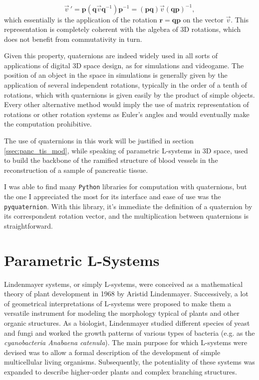 \documentclass[12pt,a4paper]{report}
\begin{document}
    \begin{equation}
        \vec v\,' = \bm{p} ( \bm{q} \vec v \bm{q}^{-1} ) \bm{p}^{-1} = (\bm{p}\bm{q}) \vec v (\bm{q}\bm{p})^{-1},
    \end{equation}
    which essentially is the application of the rotation $\bm{r} = \bm{q}\bm{p}$ on the vector $\vec v$. This representation is completely coherent with the algebra of 3D rotations, which does not benefit from commutativity in turn.

    Given this property, quaternions are indeed widely used in all sorts of applications of digital 3D space design, as for simulations and videogame. The position of an object in the space in simulations is generally given by the application of several independent rotations, typically in the order of a tenth of rotations, which with quaternions is given easily by the product of simple objects. Every other alternative method would imply the use of matrix representation of rotations or other rotation systems as Euler's angles and would eventually make the computation prohibitive.

    The use of quaternions in this work will be justified in section \ref{ssec:panc_tis_mod}, while speaking of parametric L-systems in 3D space, used to build the backbone of the ramified structure of blood vessels in the reconstruction of a sample of pancreatic tissue.

    I was able to find many \texttt{Python} libraries for computation with quaternions, but the one I appreciated the most for its interface and ease of use was the \texttt{pyquaternion}. With this library, it's immediate the definition of a quaternion by its correspondent rotation vector, and the multiplication between quaternions is straightforward.

\section{Parametric L-Systems} \label{ssec:Lsys}
    Lindenmayer systems, or simply L-systems,  were conceived as a mathematical theory of plant development \cite{lindenmayer1968mathematical} in 1968 by Aristid Lindenmayer. Successively, a lot of geometrical interpretations of L-systems were proposed to make them a versatile instrument for modeling the morphology typical of plants and other organic structures. As a biologist, Lindenmayer studied different species of yeast and fungi and worked the growth patterns of various types of bacteria (e.g. as the \textit{cyanobacteria Anabaena catenula}). The main purpose for which L-systems were devised was to allow a formal description of the development of simple multicellular living organisms. Subsequently, the potentiality of these systems was expanded to describe higher-order plants and complex branching structures.
\end{document}
